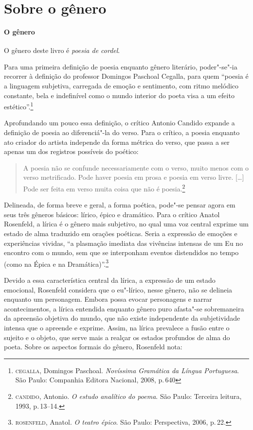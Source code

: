 \documentclass[11pt]{extarticle}
\begin{document}
\section{Sobre o gênero}

\paragraph{O gênero} O gênero deste livro é \textit{poesia de cordel}. 


Para uma primeira definição de poesia enquanto gênero literário, poder"-se"-ia recorrer à definição do professor Domingos Paschoal Cegalla, para quem ``poesia é a linguagem subjetiva, carregada de emoção e sentimento, com ritmo melódico constante, bela e indefinível como o mundo interior do poeta visa a um efeito estético''.\footnote{\textsc{cegalla}, Domingos Paschoal. \textit{Novíssima Gramática da Língua Portuguesa}. São Paulo: Companhia Editora Nacional, 2008, p.\,640}

Aprofundando um pouco essa definição, o crítico Antonio Candido expande a definição de poesia ao diferenciá"-la do verso.
Para o crítico, a poesia enquanto ato criador do artista independe da forma métrica do verso, que passa a ser apenas um dos registros possíveis do poético:

\begin{quote}
A poesia não se confunde necessariamente com o verso, muito menos com o verso metrificado. Pode haver poesia em prosa e poesia em verso livre. [\ldots]
Pode ser feita em verso muita coisa que não é poesia.\footnote{\textsc{candido}, Antonio. \textit{O estudo analítico do poema}. São Paulo: Terceira leitura, 1993, p.\,13--14.}
\end{quote}

Delineada, de forma breve e geral, a forma poética, pode"-se pensar agora em seus três gêneros básicos: lírico, épico e dramático.
Para o crítico Anatol Rosenfeld, a lírica é o gênero mais subjetivo, no qual uma voz central exprime um estado de alma traduzido em orações poéticas.
Seria a expressão de emoções e experiências vividas, ``a plasmação imediata das vivências intensas de um Eu no encontro com o mundo, sem que se interponham eventos distendidos no tempo (como na Épica e na Dramática)''.\footnote{\textsc{rosenfeld}, Anatol. \textit{O teatro épico}. São Paulo: Perspectiva, 2006, p.\,22.}

Devido a essa característica central da lírica, a expressão de um estado emocional, Rosenfeld considera que o eu"-lírico, nesse gênero, não se delineia enquanto um personagem. Embora possa evocar personagens e narrar acontecimentos, a lírica entendida enquanto gênero puro afasta"-se sobremaneira da apreensão objetiva do mundo, que não existe independente da subjetividade intensa que o apreende e exprime. Assim, na lírica prevalece a fusão entre o sujeito e o objeto, que serve mais a realçar os estados profundos de alma do poeta.
Sobre os aspectos formais do gênero, Rosenfeld nota:
\end{document}
